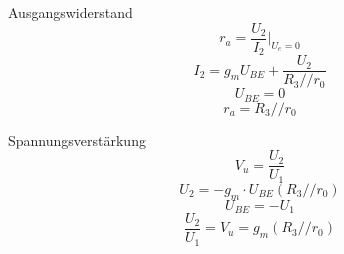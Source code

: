 \noindent Ausgangswiderstand
\[ r_a = \frac{U_2}{I_2}|_{U_e = 0}\]
\[ I_2 = g_m U_{BE} + \frac{U_2}{R_3 // r_0}\]
\[ U_{BE} = 0\]
\[ r_a = R_3 // r_0\]

\noindent Spannungsverstärkung
\[V_u = \frac{U_2}{U_1}\]
\[U_2 = -g_m \cdot U_{BE} (R_3 // r_0)\]
\[U_{BE} = - U_{1}\]
\[ \frac{U_2}{U_1} = V_u = g_m (R_3 // r_0)\]